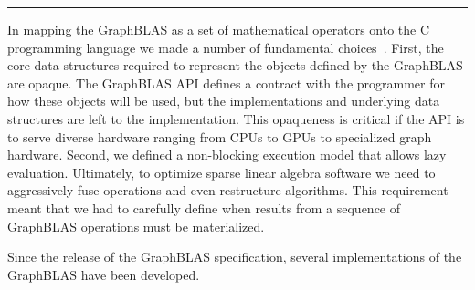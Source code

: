 \begin{table}[h]
\begin{center}
\end{center}
\hrule
\end{table}


In mapping the GraphBLAS as a set of mathematical operators onto the C programming language
we made a number of fundamental choices~\cite{cspec}.  First, the core data structures required
to represent the objects defined by the GraphBLAS are opaque.   The GraphBLAS API defines a 
contract with the programmer for how these objects will be used, but the implementations and underlying
data structures are left to the implementation.  This opaqueness is critical if the API is to serve diverse hardware
ranging from CPUs to GPUs to specialized graph hardware. Second, we defined a non-blocking  
execution model that allows lazy evaluation.  Ultimately, to optimize sparse linear algebra software we need
to aggressively fuse operations and even restructure algorithms.  This requirement meant that we had to 
carefully define when results from a sequence of GraphBLAS operations must be materialized.

Since the release of the GraphBLAS specification, several implementations of the GraphBLAS have been
developed.










